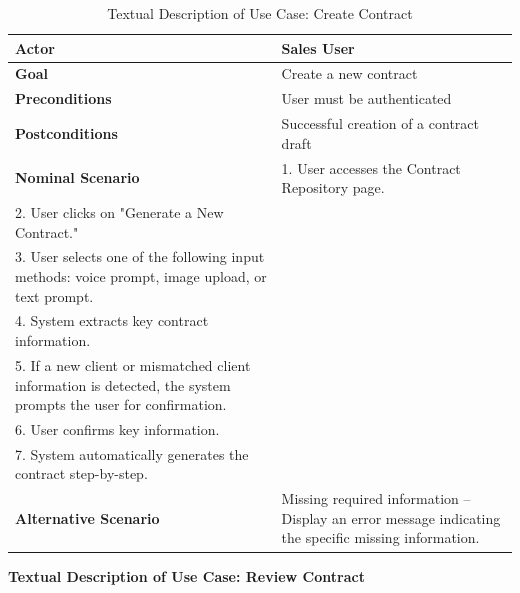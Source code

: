 \begin{table}[ht!]
    \centering
    \small
    \begin{tabularx}{\textwidth}{|l|X|}
        \hline
        \textbf{Actor} & Sales User \\
        \hline
        \textbf{Goal} & Create a new contract \\
        \hline
        \textbf{Preconditions} & User must be authenticated \\
        \hline
        \textbf{Postconditions} & Successful creation of a contract draft \\
        \hline
        \textbf{Nominal Scenario} &
            1. User accesses the Contract Repository page. \\[3pt]
            2. User clicks on "Generate a New Contract." \\[3pt]
            3. User selects one of the following input methods: voice prompt, image upload, or text prompt. \\[3pt]
            4. System extracts key contract information. \\[3pt]
            5. If a new client or mismatched client information is detected, the system prompts the user for confirmation. \\[3pt]
            6. User confirms key information. \\[3pt]
            7. System automatically generates the contract step-by-step. \\
        \hline
        \textbf{Alternative Scenario} & Missing required information – Display an error message indicating the specific missing information. \\
        \hline
    \end{tabularx}
    \caption{Textual Description of Use Case: Create Contract}
    \label{tab:create_contract}
\end{table}

\textbf{Textual Description of Use Case: Review Contract}

